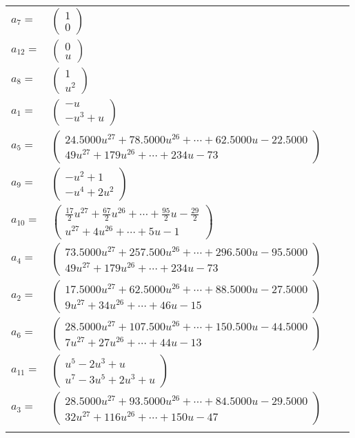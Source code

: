 \documentclass[1p]{elsarticle_modified}
\theoremstyle{definition}
\begin{document}
\begin{tabular}{m{7pt} m{180pt} m{7pt} m{180pt} }
\flushright $a_{7}=$&$\begin{pmatrix}1\\0\end{pmatrix}$ \\
\flushright $a_{12}=$&$\begin{pmatrix}0\\u\end{pmatrix}$ \\
\flushright $a_{8}=$&$\begin{pmatrix}1\\u^2\end{pmatrix}$ \\
\flushright $a_{1}=$&$\begin{pmatrix}- u\\- u^3+u\end{pmatrix}$ \\
\flushright $a_{5}=$&$\begin{pmatrix}24.5000 u^{27}+78.5000 u^{26}+\cdots+62.5000 u-22.5000\\49 u^{27}+179 u^{26}+\cdots+234 u-73\end{pmatrix}$ \\
\flushright $a_{9}=$&$\begin{pmatrix}- u^2+1\\- u^4+2 u^2\end{pmatrix}$ \\
\flushright $a_{10}=$&$\begin{pmatrix}\frac{17}{2} u^{27}+\frac{67}{2} u^{26}+\cdots+\frac{95}{2} u-\frac{29}{2}\\u^{27}+4 u^{26}+\cdots+5 u-1\end{pmatrix}$ \\
\flushright $a_{4}=$&$\begin{pmatrix}73.5000 u^{27}+257.500 u^{26}+\cdots+296.500 u-95.5000\\49 u^{27}+179 u^{26}+\cdots+234 u-73\end{pmatrix}$ \\
\flushright $a_{2}=$&$\begin{pmatrix}17.5000 u^{27}+62.5000 u^{26}+\cdots+88.5000 u-27.5000\\9 u^{27}+34 u^{26}+\cdots+46 u-15\end{pmatrix}$ \\
\flushright $a_{6}=$&$\begin{pmatrix}28.5000 u^{27}+107.500 u^{26}+\cdots+150.500 u-44.5000\\7 u^{27}+27 u^{26}+\cdots+44 u-13\end{pmatrix}$ \\
\flushright $a_{11}=$&$\begin{pmatrix}u^5-2 u^3+u\\u^7-3 u^5+2 u^3+u\end{pmatrix}$ \\
\flushright $a_{3}=$&$\begin{pmatrix}28.5000 u^{27}+93.5000 u^{26}+\cdots+84.5000 u-29.5000\\32 u^{27}+116 u^{26}+\cdots+150 u-47\end{pmatrix}$\\&\end{tabular}
\end{document}
